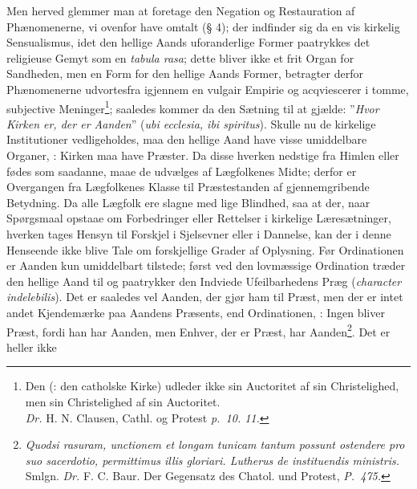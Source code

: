 \documentclass[12pt]{book}
\newcommand{\dsi}{\reflectbox{c}:}
\newcommand{\opage}[1]{\marginnote{\footnotesize\textit{[#1]}}}
\begin{document}
\opage{57} \setcounter{footnote}{0}%
Men herved glemmer man at foretage den Negation og Restauration af
Phænomenerne, vi ovenfor have omtalt (§ 4); der indfinder sig da en vis kirkelig
Sensualismus, idet den hellige Aands uforanderlige Former paatrykkes det
religieuse Gemyt som en \textit{tabula rasa}; dette bliver ikke et frit Organ for
Sandheden, men en Form for den hellige Aands Former, betragter derfor
Phænomenerne udvortesfra igjennem en vulgair Empirie og acqviescerer i tomme,
subjective Meninger\footnote{Den (\dsi{} den catholske Kirke) udleder ikke sin
Auctoritet af sin Christelighed, men sin Christelighed af sin Auctoritet.\\
\textit{Dr.} H. N. Clausen, Cathl. og Protest \textit{p.\ 10. 11.}}; saaledes
kommer da den Sætning til at gjælde: ”\emph{Hvor Kirken er, der er Aanden}”
(\textit{ubi ecclesia, ibi spiritus}). Skulle nu de kirkelige Institutioner
vedligeholdes, maa den hellige Aand have visse umiddelbare Organer, \dsi{} Kirken
maa have Præster. Da disse hverken nedstige fra Himlen eller fødes som saadanne,
maae de udvælges af Lægfolkenes Midte; derfor er Overgangen fra Lægfolkenes
Klasse til Præstestanden af gjennemgribende Betydning. Da alle Lægfolk ere slagne
med lige Blindhed, saa at der, naar Spørgsmaal opstaae om Forbedringer eller
Rettelser i kirkelige Læresætninger, hverken tages Hensyn til Forskjel i
Sjelsevner eller i Dannelse, kan der i denne Henseende ikke blive Tale om
forskjellige Grader af Oplysning. Før Ordinationen er Aanden kun umiddelbart
tilstede; først ved den lovmæssige Ordination træder den hellige Aand til og
paatrykker den Indviede Ufeilbarhedens Præg (\textit{character indelebilis}). Det
er saaledes vel Aanden, der gjør ham til Præst, men der er intet andet
Kjendemærke paa Aandens Præsents, end Ordinationen, \dsi{} Ingen bliver Præst,
fordi han har Aanden, men
\opage{58} \setcounter{footnote}{0}%
Enhver, der er Præst, har Aanden\footnote{\textit{Quodsi rasuram, unctionem et
longam tunicam tantum possunt ostendere pro suo sacerdotio, permittimus illis
gloriari. Lutherus de instituendis ministris.} Smlgn. \textit{Dr.} F. C. Baur.
Der Gegensatz des Chatol. und Protest, \textit{P.\ 475.}}. Det er heller ikke
\end{document}

